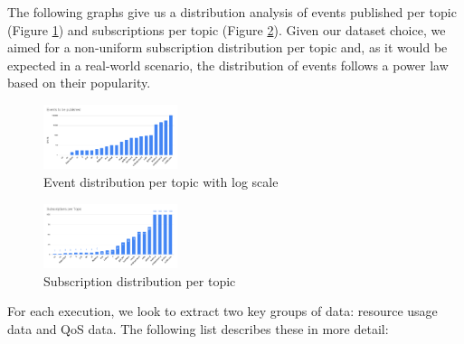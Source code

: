 The following graphs give us a distribution analysis of events published per
topic (Figure \ref{fig:events-to-be-publisher-per-topic}) and subscriptions per
topic (Figure \ref{fig:subscriptions-per-topic}). Given our dataset choice, we
aimed for a non-uniform subscription distribution per topic and, as it would be
expected in a real-world scenario, the distribution of events follows a power
law based on their popularity. 

\begin{figure}[!htb]
  \centering
  \includegraphics[width=0.35\textwidth]{../images/events-to-be-publisher-per-topic.png}
  \caption{Event distribution per topic with log scale}
  \label{fig:events-to-be-publisher-per-topic}
\end{figure}

\begin{figure}[!htb]
  \centering
  \includegraphics[width=0.35\textwidth]{../images/subscriptions-per-topic.png}
  \caption{Subscription distribution per topic}
  \label{fig:subscriptions-per-topic}
\end{figure}

For each execution, we look to extract two key groups of data: resource usage
data and QoS data. The following list describes these in more detail:

